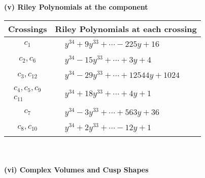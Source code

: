 \documentclass[1p]{elsarticle_modified}
\theoremstyle{definition}
\begin{document}
\newpage\renewcommand{\arraystretch}{1}
\flushleft \textbf{(v) Riley Polynomials at the component}\newline \\
\begin{tabular}{m{50pt}|m{274pt}}
Crossings & \hspace{64pt}Riley Polynomials at each crossing \\
\hline $$\begin{aligned}c_{1}\end{aligned}$$&$\begin{aligned}
&y^{34}+9 y^{33}+\cdots-225 y+16
\end{aligned}$\\
\hline $$\begin{aligned}c_{2},c_{6}\end{aligned}$$&$\begin{aligned}
&y^{34}-15 y^{33}+\cdots+3 y+4
\end{aligned}$\\
\hline $$\begin{aligned}c_{3},c_{12}\end{aligned}$$&$\begin{aligned}
&y^{34}-29 y^{33}+\cdots+12544 y+1024
\end{aligned}$\\
\hline $$\begin{aligned}c_{4},c_{5},c_{9}\\c_{11}\end{aligned}$$&$\begin{aligned}
&y^{34}+18 y^{33}+\cdots+4 y+1
\end{aligned}$\\
\hline $$\begin{aligned}c_{7}\end{aligned}$$&$\begin{aligned}
&y^{34}-3 y^{33}+\cdots+563 y+36
\end{aligned}$\\
\hline $$\begin{aligned}c_{8},c_{10}\end{aligned}$$&$\begin{aligned}
&y^{34}+2 y^{33}+\cdots-12 y+1
\end{aligned}$\\
\hline
\end{tabular}\\~\\
\newpage\flushleft \textbf{(vi) Complex Volumes and Cusp Shapes}
\end{document}
